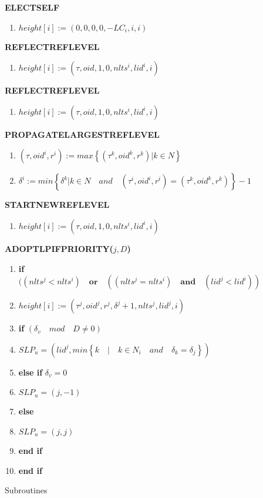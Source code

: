 \begin{figure}[hbtp]

\textbf{ELECTSELF}
\begin{enumerate}
\item $ height[i] := (0,0,0,0,-LC_{i},i,i) $
\end{enumerate}

\textbf{REFLECTREFLEVEL}
\begin{enumerate}
\item $ height[i] := (\tau ,oid,1,0,nlts^{i},lid^i,i) $
\end{enumerate}


\textbf {REFLECTREFLEVEL}
\begin{enumerate}
\item $ height[i] := (\tau ,oid,1,0,nlts^{i},lid^i,i) $
\end{enumerate}


\textbf{PROPAGATELARGESTREFLEVEL}
\begin{enumerate}
\item $ (\tau , oid^{i}, r^{i}) := max\left\lbrace (\tau ^{k},oid^{k},r^{k}) \vert k\in N\right\rbrace  $
\item $ \delta ^{i} := min \left\lbrace \delta ^{k} \vert k \in N \quad and \quad (\tau ^{i} , oid^{i}, r^{i}) = (\tau ^{k},oid^{k},r^{k})\right\rbrace - 1 $
\end{enumerate}

\textbf {STARTNEWREFLEVEL}
\begin{enumerate}
\item $ height[i] := (\tau ,oid,1,0,nlts^{i},lid^i,i) $
\end{enumerate}

\textbf {ADOPTLPIFPRIORITY($j, D$)}
\begin{enumerate}
\item \textbf{if}$( (nlts^{j}<nlts^{i})\quad \textbf{or} \quad ((nlts^{j}=nlts^{i}) \quad \textbf{and} \quad (lid^{j} < lid^{i}))$
\item  \quad $ height[i] := (\tau ^{j} ,oid^{j},r^{j},\delta ^{j}+1,nlts^{j},lid^j,i) $

\item \quad \textbf{if} $ (\delta _{v} \quad mod \quad D \neq 0) $
\item \quad \quad $ SLP_u = (lid^j, min \left\lbrace k \quad \vert \quad k\in N_i \quad and \quad \delta_k = \delta_j \right\rbrace  )$
\item \quad \textbf{else if } $ \delta_v = 0 $
\item \quad \quad $ SLP_u = (j, -1)$
\item \quad \textbf{else}
\item \quad \quad $ SLP_u = (j, j)$
\item \quad \textbf{end if}
\item \textbf{end if}
\end{enumerate}

\caption{Subroutines}

\end{figure}


